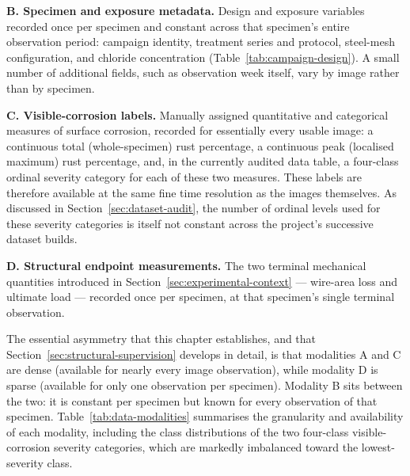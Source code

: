 \textbf{B. Specimen and exposure metadata.} Design and exposure variables
recorded once per specimen and constant across that specimen's entire
observation period: campaign identity, treatment series and protocol,
steel-mesh configuration, and chloride concentration (Table~\ref{tab:campaign-design}).
A small number of additional fields, such as observation week itself, vary
by image rather than by specimen.

\textbf{C. Visible-corrosion labels.} Manually assigned quantitative and
categorical measures of surface corrosion, recorded for essentially every
usable image: a continuous total (whole-specimen) rust percentage, a
continuous peak (localised maximum) rust percentage, and, in the currently
audited data table, a four-class ordinal severity category for each of
these two measures. These labels are therefore available at the same fine
time resolution as the images themselves. As discussed in
Section~\ref{sec:dataset-audit}, the number of ordinal levels used for
these severity categories is itself not constant across the project's
successive dataset builds.

\textbf{D. Structural endpoint measurements.} The two terminal mechanical
quantities introduced in Section~\ref{sec:experimental-context} — wire-area
loss and ultimate load — recorded once per specimen, at that specimen's
single terminal observation.

The essential asymmetry that this chapter establishes, and that
Section~\ref{sec:structural-supervision} develops in detail, is that
modalities A and C are dense (available for nearly every image
observation), while modality D is sparse (available for only one
observation per specimen). Modality B sits between the two: it is
constant per specimen but known for every observation of that specimen.
Table~\ref{tab:data-modalities} summarises the granularity and
availability of each modality, including the class distributions of the
two four-class visible-corrosion severity categories, which are markedly
imbalanced toward the lowest-severity class.

